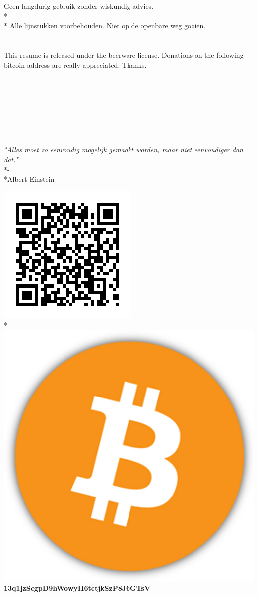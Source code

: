 \documentclass[10pt]{article}
\begin{document}
Geen langdurig gebruik zonder wiskundig advies.\\*\\*
Alle lijnstukken voorbehouden. Niet op de openbare weg gooien.\\\\\\
This resume is released under the beerware license. Donations on the following bitcoin address are really appreciated. Thanks.\\\\\\\\\\\\\\\\
\begin{center}
\textit{"Alles moet zo eenvoudig mogelijk gemaakt worden, maar niet eenvoudiger dan dat."}\\*-\\*Albert Einstein
\end{center}
\begin{center}
\includegraphics[scale=0.5]{BitcoinAddress.png}\\*
\includegraphics[scale=0.02]{Bitcoin.png} \textbf{13q1jzScgpD9hWowyH6tctjkSzP8J6GTsV}
\end{center}
\clearpage
\end{document}
